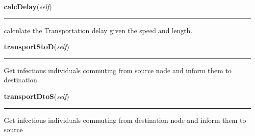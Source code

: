     \label{Epigrass:simobj:edge:calcDelay}

    \vspace{0.5ex}

    \begin{boxedminipage}{\textwidth}

    \raggedright \textbf{calcDelay}(\textit{self})

    \vspace{-1.5ex}

    \rule{\textwidth}{0.5\fboxrule}
    calculate the Transportation delay given the speed and length.

    \vspace{1ex}

    \end{boxedminipage}

    \label{Epigrass:simobj:edge:transportStoD}

    \vspace{0.5ex}

    \begin{boxedminipage}{\textwidth}

    \raggedright \textbf{transportStoD}(\textit{self})

    \vspace{-1.5ex}

    \rule{\textwidth}{0.5\fboxrule}
    Get infectious individuals commuting from source node and inform them 
    to destination

    \vspace{1ex}

    \end{boxedminipage}

    \label{Epigrass:simobj:edge:transportDtoS}

    \vspace{0.5ex}

    \begin{boxedminipage}{\textwidth}

    \raggedright \textbf{transportDtoS}(\textit{self})

    \vspace{-1.5ex}

    \rule{\textwidth}{0.5\fboxrule}
    Get infectious individuals commuting from destination node and inform 
    them to source

    \vspace{1ex}

    \end{boxedminipage}

